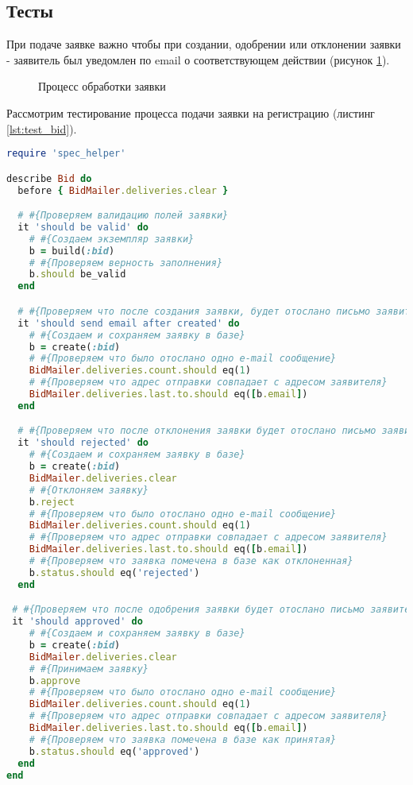 \subsection{Тесты}
При подаче заявке важно чтобы при создании, одобрении или отклонении заявки -
заявитель был уведомлен по email о соответствующем действии (рисунок
\ref{ris:accept_reject_bid}).

\begin{figure}[h]
\caption{Процесс обработки заявки}
\label{ris:accept_reject_bid}
\end{figure}

Рассмотрим тестирование процесса подачи заявки на регистрацию (листинг
\ref{lst:test_bid}).

\begin{lstlisting}[language=Ruby,caption=Тестирование подачи заявки
,label={lst:test_bid}] 
require 'spec_helper'

describe Bid do
  before { BidMailer.deliveries.clear }

  # #{Проверяем валидацию полей заявки}
  it 'should be valid' do
    # #{Создаем экземпляр заявки}
    b = build(:bid)
    # #{Проверяем верность заполнения}
    b.should be_valid
  end

  # #{Проверяем что после создания заявки, будет отослано письмо заявителю}
  it 'should send email after created' do
    # #{Создаем и сохраняем заявку в базе}
    b = create(:bid)
    # #{Проверяем что было отослано одно e-mail сообщение}
    BidMailer.deliveries.count.should eq(1)
    # #{Проверяем что адрес отправки совпадает с адресом заявителя}
    BidMailer.deliveries.last.to.should eq([b.email])
  end

  # #{Проверяем что после отклонения заявки будет отослано письмо заявителю}
  it 'should rejected' do
    # #{Создаем и сохраняем заявку в базе}
    b = create(:bid)
    BidMailer.deliveries.clear
    # #{Отклоняем заявку}
    b.reject
    # #{Проверяем что было отослано одно e-mail сообщение}
    BidMailer.deliveries.count.should eq(1)
    # #{Проверяем что адрес отправки совпадает с адресом заявителя}
    BidMailer.deliveries.last.to.should eq([b.email])
    # #{Проверяем что заявка помечена в базе как отклоненная}
    b.status.should eq('rejected')
  end

 # #{Проверяем что после одобрения заявки будет отослано письмо заявителю}
 it 'should approved' do
    # #{Создаем и сохраняем заявку в базе}
    b = create(:bid)
    BidMailer.deliveries.clear
    # #{Принимаем заявку}
    b.approve
    # #{Проверяем что было отослано одно e-mail сообщение}
    BidMailer.deliveries.count.should eq(1)
    # #{Проверяем что адрес отправки совпадает с адресом заявителя}
    BidMailer.deliveries.last.to.should eq([b.email])
    # #{Проверяем что заявка помечена в базе как принятая}
    b.status.should eq('approved')
  end
end
\end{lstlisting}

